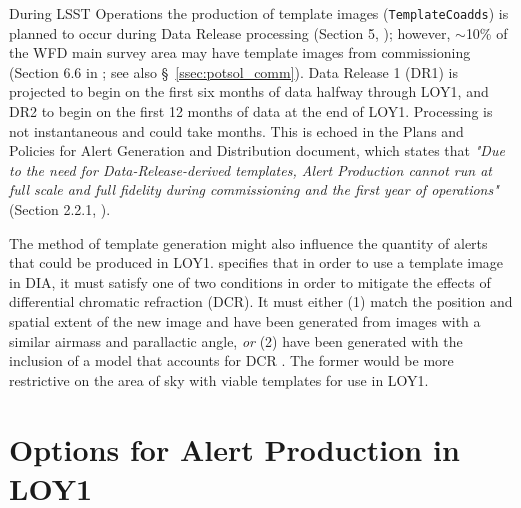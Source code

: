 \documentclass[DM,lsstdraft,toc]{lsstdoc}
\begin{document}
During LSST Operations the production of template images ({\tt TemplateCoadds}) is planned to occur during Data Release processing (Section 5, ); however, $\sim$10\% of the WFD main survey area may have template images from commissioning (Section 6.6 in ; see also \S~\ref{ssec:potsol_comm}). Data Release 1 (DR1) is projected to begin on the first six months of data halfway through LOY1, and DR2 to begin on the first 12 months of data at the end of LOY1. Processing is not instantaneous and could take months. This is echoed in the Plans and Policies for Alert Generation and Distribution document, which states that {\it "Due to the need for Data-Release-derived templates, Alert Production cannot run at full scale and full fidelity during commissioning and the first year of operations"} (Section 2.2.1, ). 

The method of template generation might also influence the quantity of alerts that could be produced in LOY1.  specifies that in order to use a template image in DIA, it must satisfy one of two conditions in order to mitigate the effects of differential chromatic refraction (DCR). It must either (1) match the position and spatial extent of the new image and have been generated from images with a similar airmass and parallactic angle, {\em or} (2) have been generated with the inclusion of a model that accounts for DCR . The former would be more restrictive on the area of sky with viable templates for use in LOY1.


\clearpage
\section{Options for Alert Production in LOY1}\label{sec:potsol}
\end{document}
